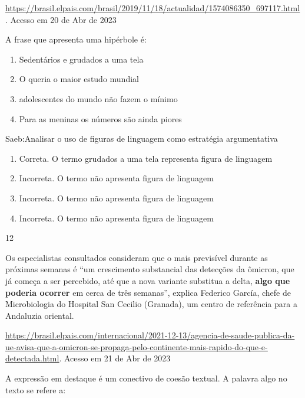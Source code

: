 {{\begin{escolha}
{\begin{itemize}
\begin{itemize}
\href{https://brasil.elpais.com/brasil/2019/11/18/actualidad/1574086350_697117.html}{\uline{https://brasil.elpais.com/brasil/2019/11/18/actualidad/1574086350\_697117.html}}.
Acesso em 20 de Abr de 2023

A frase que apresenta uma hipérbole é:

\begin{enumerate}
\def\labelenumi{\alph{enumi})}
\item
  Sedentários e grudados a uma tela
\item
  O queria o maior estudo mundial
\item
  adolescentes do mundo não fazem o mínimo
\item
  Para as meninas os números são ainda piores
\end{enumerate}

Saeb:Analisar o uso de figuras de linguagem como estratégia
argumentativa

\begin{enumerate}
\def\labelenumi{\arabic{enumi}.}
\item
  Correta. O termo grudados a uma tela representa figura de linguagem
\item
  Incorreta. O termo não apresenta figura de linguagem
\item
  Incorreta. O termo não apresenta figura de linguagem
\item
  Incorreta. O termo não apresenta figura de linguagem
\end{enumerate}

\num{12}

Os especialistas consultados consideram que o mais previsível durante as
próximas semanas é ``um crescimento substancial das detecções da
ômicron, que já começa a ser percebido, até que a nova variante
substitua a delta, \textbf{algo que poderia ocorrer} em cerca de três
semanas'', explica Federico García, chefe de Microbiologia do Hospital
San Cecilio (Granada), um centro de referência para a Andaluzia
oriental.

\href{https://brasil.elpais.com/internacional/2021-12-13/agencia-de-saude-publica-da-ue-avisa-que-a-omicron-se-propaga-pelo-continente-mais-rapido-do-que-e-detectada.html}{\uline{https://brasil.elpais.com/internacional/2021-12-13/agencia-de-saude-publica-da-ue-avisa-que-a-omicron-se-propaga-pelo-continente-mais-rapido-do-que-e-detectada.html}}.
Acesso em 21 de Abr de 2023

A expressão em destaque é um conectivo de coesão textual. A palavra algo
no texto se refere a:


\end{itemize}
\end{itemize}}
\end{escolha}}}
